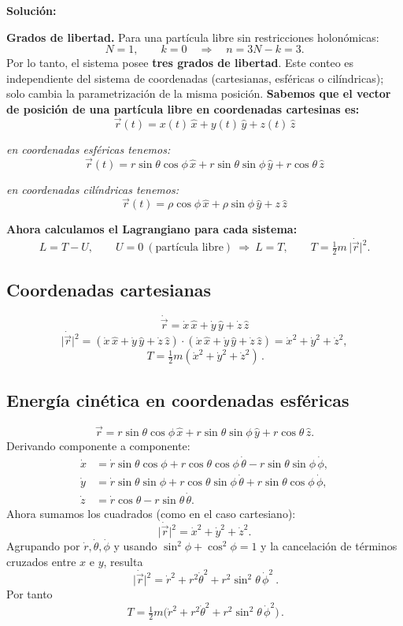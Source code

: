 \documentclass{article}
\begin{document}
\textcolor{Cinnabar}{\textbf{Soluci\'on:}}

\noindent\textbf{Grados de libertad.}
Para una partícula libre sin restricciones holonómicas:
\[
N=1,\qquad k=0 \quad\Rightarrow\quad n=3N-k=3.
\]
Por lo tanto, el sistema posee \textbf{tres grados de libertad}. 
Este conteo es independiente del sistema de coordenadas (cartesianas, esféricas o cilíndricas); 
solo cambia la parametrización de la misma posición.
\noindent\textbf{Sabemos que el vector de posición de una partícula libre en coordenadas cartesinas es:}
\[
\vec r(t)=x(t)\,\hat{x}+y(t)\,\hat{y}+z(t)\,\hat{z}
\]

\noindent\textit{en coordenadas esféricas tenemos:}
\[
\vec r(t)=r\sin\theta\cos\phi\,\hat{x}
+r\sin\theta\sin\phi\,\hat{y}
+r\cos\theta\,\hat{z}
\]

\noindent\textit{en coordenadas cilíndricas tenemos:}
\[
\vec r(t)=\rho\cos\phi\,\hat{x}
+\rho\sin\phi\,\hat{y}
+z\,\hat{z}
\]

\bigskip
\noindent\textbf{Ahora calculamos el Lagrangiano para cada sistema:}
\[
L=T-U,\qquad U=0\ (\text{partícula libre})\ \Rightarrow\ L=T,
\qquad
T=\tfrac12 m\,\lvert\dot{\vec r}\rvert^2.
\]

\subsection*{Coordenadas cartesianas}
\[
\dot{\vec r}=\dot x\,\hat{x}+\dot y\,\hat{y}+\dot z\,\hat{z}
\]
\[
\lvert\dot{\vec r}\rvert^2
=(\dot x\,\hat{x}+\dot y\,\hat{y}+\dot z\,\hat{z})\cdot
(\dot x\,\hat{x}+\dot y\,\hat{y}+\dot z\,\hat{z})
=\dot x^2+\dot y^2+\dot z^2,
\]
\[
\boxed{\,T=\tfrac12 m(\dot x^2+\dot y^2+\dot z^2)\,}.
\]

\subsection*{Energía cinética en coordenadas esféricas }
\[
\vec r=r\sin\theta\cos\phi\,\hat{x}
+r\sin\theta\sin\phi\,\hat{y}
+r\cos\theta\,\hat{z}.
\]
\noindent Derivando componente a componente:
\[
\begin{aligned}
\dot x&=\dot r\sin\theta\cos\phi
+r\cos\theta\cos\phi\,\dot\theta
-r\sin\theta\sin\phi\,\dot\phi,\\
\dot y&=\dot r\sin\theta\sin\phi
+r\cos\theta\sin\phi\,\dot\theta
+r\sin\theta\cos\phi\,\dot\phi,\\
\dot z&=\dot r\cos\theta
-r\sin\theta\,\dot\theta.
\end{aligned}
\]
\noindent Ahora sumamos los cuadrados (como en el caso cartesiano):
\[
\lvert\dot{\vec r}\rvert^2=\dot x^2+\dot y^2+\dot z^2.
\]
Agrupando por \(\dot r,\dot\theta,\dot\phi\) y usando
\(\sin^2\phi+\cos^2\phi=1\) y la cancelación de términos cruzados
entre \(x\) e \(y\), resulta
\[
\boxed{\ \lvert\dot{\vec r}\rvert^2
=\dot r^2+r^2\dot\theta^2+r^2\sin^2\theta\,\dot\phi^2\ }.
\]
Por tanto
\[
\boxed{\,T=\tfrac12 m\big(\dot r^2+r^2\dot\theta^2+r^2\sin^2\theta\,\dot\phi^2\big)\,}.
\]
\end{document}
